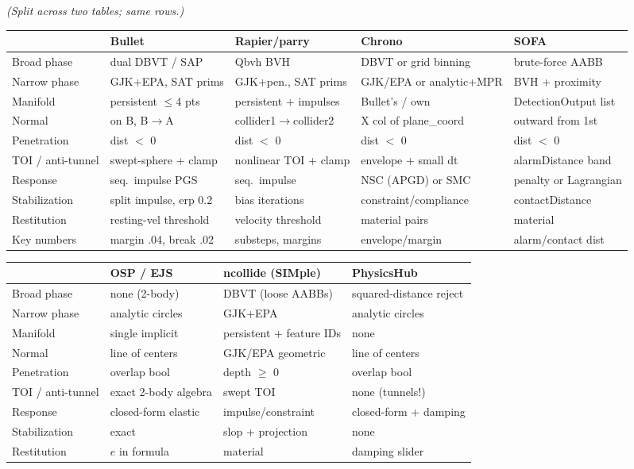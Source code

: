 \documentclass[11pt]{article}
\begin{document}
\emph{(Split across two tables; same rows.)}

\begin{center}\small
\begin{tabular}{lp{3.0cm}p{3.0cm}p{3.0cm}p{2.9cm}}
 & \textbf{Bullet} & \textbf{Rapier/parry} & \textbf{Chrono} & \textbf{SOFA}\\\hline
Broad phase & dual DBVT / SAP & Qbvh BVH & DBVT or grid binning & brute-force AABB\\
Narrow phase & GJK+EPA, SAT prims & GJK+pen., SAT prims & GJK/EPA or analytic+MPR & BVH + proximity\\
Manifold & persistent $\le$4 pts & persistent + impulses & Bullet's / own & DetectionOutput list\\
Normal & on B, B$\to$A & collider1$\to$collider2 & X col of plane\_coord & outward from 1st\\
Penetration & dist $<$ 0 & dist $<$ 0 & dist $<$ 0 & dist $<$ 0\\
TOI / anti-tunnel & swept-sphere + clamp & nonlinear TOI + clamp & envelope + small dt & alarmDistance band\\
Response & seq.\ impulse PGS & seq.\ impulse & NSC (APGD) or SMC & penalty or Lagrangian\\
Stabilization & split impulse, erp 0.2 & bias iterations & constraint/compliance & contactDistance\\
Restitution & resting-vel threshold & velocity threshold & material pairs & material\\
Key numbers & margin .04, break .02 & substeps, margins & envelope/margin & alarm/contact dist\\
\end{tabular}
\end{center}

\begin{center}\small
\begin{tabular}{lp{3.6cm}p{3.6cm}p{3.6cm}}
 & \textbf{OSP / EJS} & \textbf{ncollide (SIMple)} & \textbf{PhysicsHub}\\\hline
Broad phase & none (2-body) & DBVT (loose AABBs) & squared-distance reject\\
Narrow phase & analytic circles & GJK+EPA & analytic circles\\
Manifold & single implicit & persistent + feature IDs & none\\
Normal & line of centers & GJK/EPA geometric & line of centers\\
Penetration & overlap bool & depth $\ge$ 0 & overlap bool\\
TOI / anti-tunnel & exact 2-body algebra & swept TOI & none (tunnels!)\\
Response & closed-form elastic & impulse/constraint & closed-form + damping\\
Stabilization & exact & slop + projection & none\\
Restitution & $e$ in formula & material & damping slider\\
\end{tabular}
\end{center}
\end{document}
